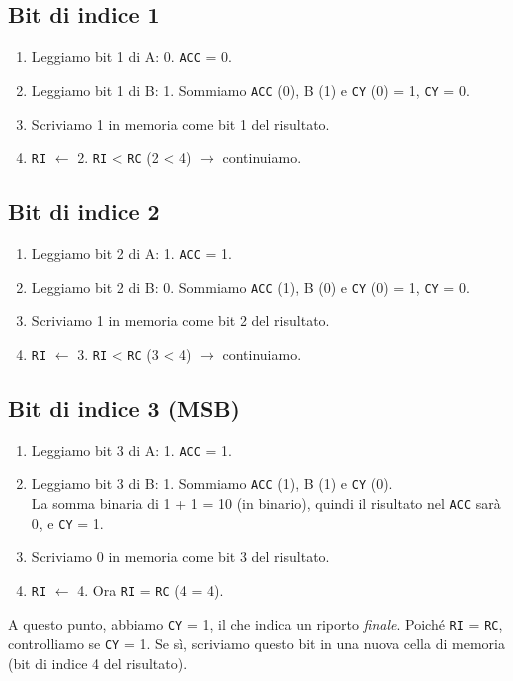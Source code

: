 \documentclass[a4paper,12pt]{report}
\begin{document}
\subsection*{Bit di indice 1}
\begin{enumerate}
    \item Leggiamo bit 1 di A: 0. \texttt{ACC} = 0.
    \item Leggiamo bit 1 di B: 1. Sommiamo \texttt{ACC} (0), B (1) e \texttt{CY} (0) = 1, \texttt{CY} = 0.
    \item Scriviamo 1 in memoria come bit 1 del risultato.
    \item \texttt{RI} $\leftarrow$ 2. \texttt{RI} < \texttt{RC} (2 < 4) $\rightarrow$ continuiamo.
\end{enumerate}

\subsection*{Bit di indice 2}
\begin{enumerate}
    \item Leggiamo bit 2 di A: 1. \texttt{ACC} = 1.
    \item Leggiamo bit 2 di B: 0. Sommiamo \texttt{ACC} (1), B (0) e \texttt{CY} (0) = 1, \texttt{CY} = 0.
    \item Scriviamo 1 in memoria come bit 2 del risultato.
    \item \texttt{RI} $\leftarrow$ 3. \texttt{RI} < \texttt{RC} (3 < 4) $\rightarrow$ continuiamo.
\end{enumerate}

\subsection*{Bit di indice 3 (MSB)}
\begin{enumerate}
    \item Leggiamo bit 3 di A: 1. \texttt{ACC} = 1.
    \item Leggiamo bit 3 di B: 1. Sommiamo \texttt{ACC} (1), B (1) e \texttt{CY} (0). \\
    La somma binaria di 1 + 1 = 10 (in binario), quindi il risultato nel \texttt{ACC} sarà 0, e \texttt{CY} = 1.
    \item Scriviamo 0 in memoria come bit 3 del risultato.
    \item \texttt{RI} $\leftarrow$ 4. Ora \texttt{RI} = \texttt{RC} (4 = 4).
\end{enumerate}

A questo punto, abbiamo \texttt{CY} = 1, il che indica un riporto \emph{finale}. Poiché \texttt{RI} = \texttt{RC}, controlliamo se \texttt{CY} = 1. Se sì, scriviamo questo bit in una nuova cella di memoria (bit di indice 4 del risultato).
\end{document}
